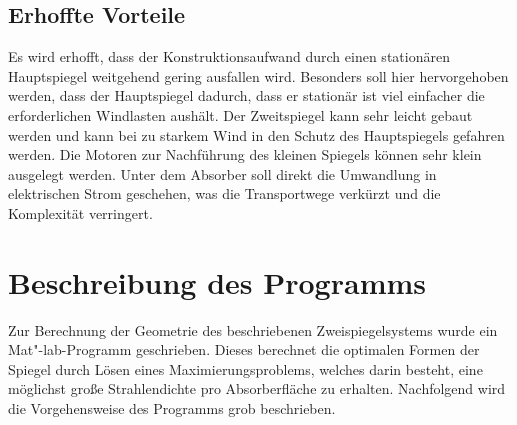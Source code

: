 \documentclass[fontsize=10pt,paper=a4,bibliography=totoc]{scrartcl}
\begin{document}
\subsection{Erhoffte Vorteile}
Es wird erhofft, dass der Konstruktionsaufwand durch einen stationären Hauptspiegel weitgehend gering ausfallen wird. Besonders soll hier hervorgehoben werden, dass der Hauptspiegel dadurch, dass er stationär ist viel einfacher die erforderlichen Windlasten aushält. Der Zweitspiegel kann sehr leicht gebaut werden und kann bei zu starkem Wind in den Schutz des Hauptspiegels gefahren werden. Die Motoren zur Nachführung des kleinen Spiegels können sehr klein ausgelegt werden. Unter dem Absorber soll direkt die Umwandlung in elektrischen Strom geschehen, was die Transportwege verkürzt und die Komplexität verringert. 

\section{Beschreibung des Programms}
Zur Berechnung der Geometrie des beschriebenen Zweispiegelsystems wurde ein Mat"-lab-Programm geschrieben. Dieses berechnet die optimalen Formen der Spiegel durch Lösen eines Maximierungsproblems, welches darin besteht, eine möglichst große Strahlendichte pro Absorberfläche zu erhalten. Nachfolgend wird die Vorgehensweise des Programms grob beschrieben.
\end{document}
